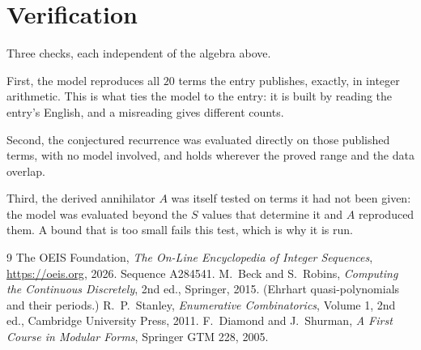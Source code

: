 \documentclass[11pt,a4paper]{article}
\theoremstyle{plain}
\theoremstyle{definition}
\begin{document}
\section{Verification}

Three checks, each independent of the algebra above.

First, the model reproduces all $20$ terms the entry publishes, exactly, in integer
arithmetic. This is what ties the model to the entry: it is built by reading the entry's
English, and a misreading gives different counts.

Second, the conjectured recurrence was evaluated directly on those published terms, with no
model involved, and holds wherever the proved range and the data overlap.

Third, the derived annihilator $A$ was itself tested on terms it had not been given: the model
was evaluated beyond the $S$ values that determine it and $A$ reproduced them. A bound that is
too small fails this test, which is why it is run.

\begin{thebibliography}{9}
 The OEIS Foundation, \emph{The On-Line Encyclopedia of Integer
Sequences}, \url{https://oeis.org}, 2026. Sequence A284541.
 M.~Beck and S.~Robins, \emph{Computing the Continuous Discretely},
2nd ed., Springer, 2015. (Ehrhart quasi-polynomials and their periods.)
 R.~P.~Stanley, \emph{Enumerative Combinatorics}, Volume 1, 2nd ed.,
Cambridge University Press, 2011.
 F.~Diamond and J.~Shurman, \emph{A First Course in Modular Forms},
Springer GTM 228, 2005.
\end{thebibliography}
\end{document}
